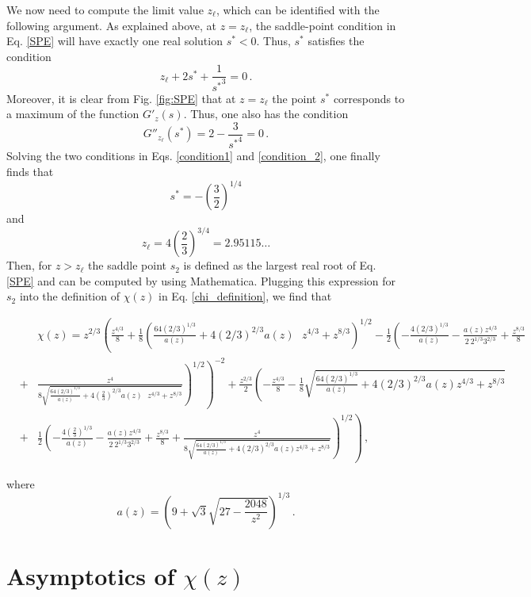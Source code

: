 \documentclass[aps,pre,twocolumn,superscriptaddress,showpacs]{revtex4-1}
\newcommand{\be}{\begin{equation}}
\newcommand{\ee}{\end{equation}}
\newcommand{\bea}{\begin{eqnarray}}
\newcommand{\eea}{\end{eqnarray}}
\begin{document}
We now need to compute the limit value $z_{\ell}$, which can be identified with the following argument. As explained above, at $z=z_{\ell}$, the saddle-point condition in Eq. \eqref{SPE} will have exactly one real solution $s^*<0$. Thus, $s^*$ satisfies the condition
\be
z_{\ell} +2s^*+\frac{1}{{s^*}^3}=0\,.
\label{condition1}
\ee
Moreover, it is clear from Fig. \ref{fig:SPE} that at $z=z_{\ell}$ the point $s^*$ corresponds to a maximum of the function $G'_z(s)$. Thus, one also has the condition
\be
G''_{z_{\ell}}(s^*)=2-\frac{3}{{s^*}^4}=0\,.
\label{condition_2}
\ee
Solving the two conditions in Eqs. \eqref{condition1} and \eqref{condition_2}, one finally finds that
\be
s^*=-\left(\frac32\right)^{1/4}
\label{s_star}
\ee
and
\be
z_{\ell}=4\left(\frac23\right)^{3/4}=2.95115\ldots
\ee
Then, for $z>z_{\ell}$ the saddle point $s_2$ is defined as the largest real root of Eq. \eqref{SPE} and can be computed by using Mathematica. Plugging this expression for $s_2$ into the definition of $\chi(z)$ in Eq. \eqref{chi_definition}, we find that
\begin{widetext}
\bea
&&\chi(z)=z^{2/3}
\left(\frac{z^{4/3}}{8}+\frac{1}{8} \left(\frac{64 \left(2/3\right)^{1/3}}{a(z)}+4 \left(2/3\right)^{2/3} a(z)\text{  }z^{4/3}+z^{8/3}\right)^{1/2}-\right.
\frac{1}{2} \left(-\frac{4 \left(2/3\right)^{1/3}}{a(z)}-\frac{a(z) z^{4/3}}{2\ 2^{1/3} 3^{2/3}}+\frac{z^{8/3}}{8}\right.\nonumber\\&+ &
\left.\left.\frac{z^4}{8 \sqrt{\frac{64 \left(2/3\right)^{1/3}}{a(z)}+4 \left(\frac{2}{3}\right)^{2/3} a(z)\text{  }z^{4/3}+z^{8/3}}}\right)^{1/2}\right)^{-2}+
\frac{z^{2/3}}{2} \left(-\frac{z^{4/3}}{8}-\frac{1}{8} \sqrt{\frac{64 \left(2/3\right)^{1/3}}{a(z)}+4 \left(2/3\right)^{2/3} a(z) z^{4/3}+z^{8/3}}\right.\nonumber\\ &+&
\frac{1}{2} \left(-\frac{4 \left(\frac{2}{3}\right)^{1/3}}{a(z)}-\frac{a(z) z^{4/3}}{2\ 2^{1/3} 3^{2/3}}+\frac{z^{8/3}}{8}+\right.
\left.\left.\frac{z^4}{8 \sqrt{\frac{64 \left(2/3\right)^{1/3}}{a(z)}+4 \left(2/3\right)^{2/3} a(z) z^{4/3}+z^{8/3}}}\right)^{1/2}\right)\,,
\label{chi_expression}
\eea

\end{widetext}
where
\be
a(z)=\left(9+\sqrt{3}\sqrt{27-\frac{2048}{z^2}}\right)^{1/3}\,.
\ee




\section{Asymptotics of $\chi(z)$}
\label{app:asymptotics}
\end{document}
